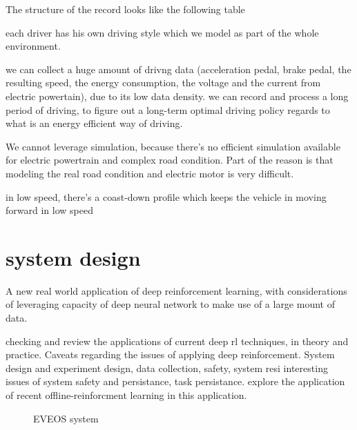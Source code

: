 \documentclass{article}
\begin{document}
The structure of the record looks like the following table


each driver has his own driving style which we model as part of the whole environment.

we can collect a huge amount of drivng data (acceleration pedal, brake pedal, the resulting speed, the energy consumption, the voltage and the current from electric powertain), due to its low data density. we can record and process a long period of driving, to figure out a long-term optimal driving policy regards to what is an energy efficient way of driving.


We cannot leverage simulation, because there's no efficient simulation available for electric powertrain and complex road condition. Part of the reason is that modeling the real road condition and electric motor is very difficult.

in low speed, there's a coast-down profile which keeps the vehicle in moving forward in low speed
\section{system design}
\label{sec:design}




A new real world application of deep reinforcement learning, with considerations of leveraging capacity of deep neural network to make use of a large mount of data.

checking and review the applications of current deep rl techniques, in theory and practice. Caveats regarding the issues of applying deep reinforcement. System design and experiment design, data collection, safety, system resi
interesting issues of system safety and persistance, task persistance.
explore the application of recent offline-reinforcment learning in this application.

\begin{figure}[ht]
	\centering
	\def\svgwidth{0.8\columnwidth}
	
	\caption{\label{fig:veos} EVEOS system}
	\label{fig:EVEOS system}
\end{figure}


%		
%		
\end{document}
